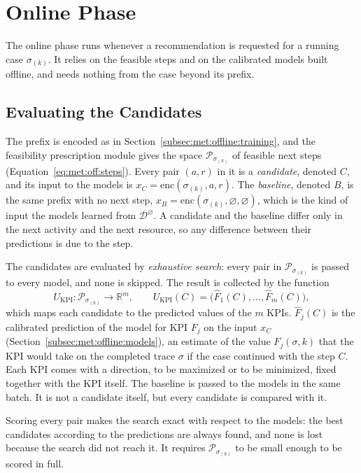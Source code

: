 \section{Online Phase}
\label{sec:met:online}
The online phase runs whenever a recommendation is requested for a running
case $\sigma_{(k)}$. It relies on the feasible steps and on the calibrated
models built offline, and needs nothing from the case beyond its prefix.

\subsection{Evaluating the Candidates}
\label{subsec:met:online:eval}
The prefix is encoded as in Section~\ref{subsec:met:offline:training}, and
the feasibility prescription module gives the space
$\mathcal{P}_{\sigma_{(k)}}$ of feasible next steps (Equation~\eqref{eq:met:off:steps}). Every pair
$(a, r)$ in it is a \emph{candidate}, denoted $C$, and its input to the
models is $x_C = \mathrm{enc}(\sigma_{(k)}, a, r)$. The \emph{baseline},
denoted $B$, is the same prefix with no next step,
$x_B = \mathrm{enc}(\sigma_{(k)}, \varnothing, \varnothing)$, which is the
kind of input the models learned from $\mathcal{D}^{\varnothing}$. A
candidate and the baseline differ only in the next activity and the next
resource, so any difference between their predictions is due to the step.

The candidates are evaluated by \emph{exhaustive search}: every pair in
$\mathcal{P}_{\sigma_{(k)}}$ is passed to every model, and none is skipped.
The result is collected by the function
\begin{equation}
  U_{\mathrm{KPI}} : \mathcal{P}_{\sigma_{(k)}} \to \mathbb{R}^{m}, \qquad
  U_{\mathrm{KPI}}(C) = \bigl( \hat{F}_1(C), \dots, \hat{F}_m(C) \bigr),
  \label{eq:met:on:objectives}
\end{equation}
which maps each candidate to the predicted values of the $m$ KPIs.
$\hat{F}_j(C)$ is the calibrated prediction of the model for KPI $F_j$ on
the input $x_C$ (Section~\ref{subsec:met:offline:models}), an estimate of
the value $F_j(\sigma, k)$ that the KPI would take on the completed trace
$\sigma$ if the case continued with the step $C$. Each KPI comes with a
direction, to be maximized or to be minimized, fixed together with the KPI
itself. The
baseline is passed to the models in the same batch. It is not a candidate
itself, but every candidate is compared with it.

Scoring every pair makes the search exact with respect to the models: the
best candidates according to the predictions are always found, and none is
lost because the search did not reach it. It requires
$\mathcal{P}_{\sigma_{(k)}}$ to be small enough to be scored in full.

